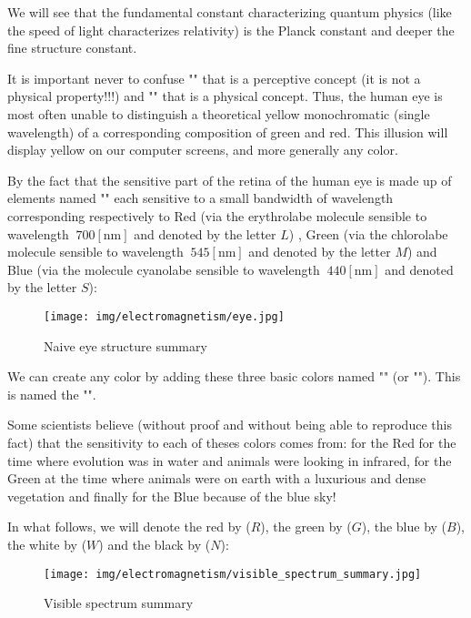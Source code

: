	\begin{tcolorbox}[title=Remark,colframe=black,arc=10pt]
	We will see that the fundamental constant characterizing quantum physics (like the speed of light characterizes relativity) is the Planck constant and deeper the fine structure constant.
	\end{tcolorbox}	
	
	It is important never to confuse "" that is a perceptive concept  (it is not a physical property!!!) and "" that is a physical concept. Thus, the human eye is most often unable to distinguish a theoretical yellow monochromatic (single wavelength) of a corresponding composition of green and red. This illusion will display yellow on our computer screens, and more generally any color.
	
	By the fact that the sensitive part of the retina of the human eye is made up of elements named "" each sensitive to a small bandwidth of wavelength corresponding respectively to Red (via the erythrolabe molecule sensible to wavelength $~700 [\text{nm}]$ and denoted by the letter $L$) , Green (via the chlorolabe molecule sensible to wavelength $~545 [\text{nm}]$ and denoted by the letter $M$) and Blue (via the molecule cyanolabe sensible to wavelength $~440 [\text{nm}]$ and denoted by the letter $S$): 
	\begin{figure}[H]
		\centering
		\texttt{[image: img/electromagnetism/eye.jpg]}
		\caption{Naive eye structure summary}
	\end{figure}
	We can create any color by adding these three basic colors named "" (or ""). This is named the "".
	
	\begin{tcolorbox}[title=Remark,colframe=black,arc=10pt]
	Some scientists believe (without proof and without being able to reproduce this fact) that the sensitivity to each of theses colors comes from: for the Red for the time where evolution was in water and animals were looking in infrared, for the Green at the time where animals were on earth with a luxurious and dense vegetation and finally for the Blue because of the blue sky!
	\end{tcolorbox}	
	In what follows, we will denote the red by ($R$), the green by ($G$), the blue by ($B$), the white by ($W$) and the black by ($N$):
	\begin{figure}[H]
		\centering
		\texttt{[image: img/electromagnetism/visible\_spectrum\_summary.jpg]}
		\caption{Visible spectrum summary}
	\end{figure}
	
